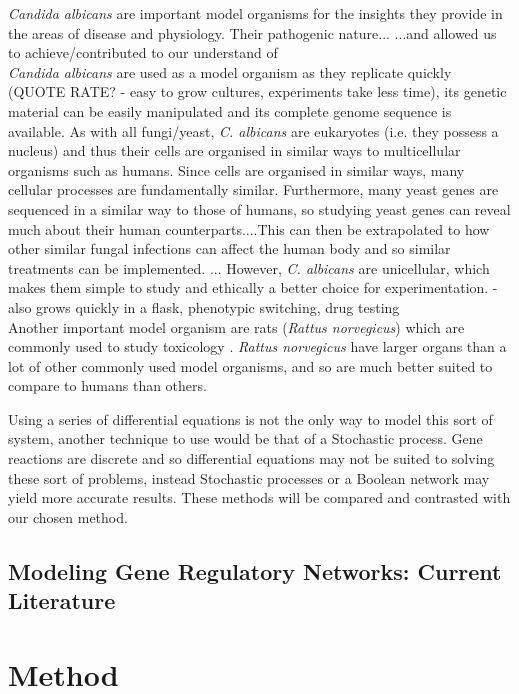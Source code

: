 \documentclass[]{article}
\begin{document}
\textit{Candida albicans} are important model organisms for the insights they provide in the areas of disease and physiology. Their pathogenic nature... %
...and allowed us to achieve/contributed to our understand of %
\\
\textit{Candida albicans} are used as a model organism as they replicate quickly (QUOTE RATE? - easy to grow cultures, experiments take less time), its genetic material can be easily manipulated and its complete genome sequence is available\cite{kabir2012candida}. As with all fungi/yeast, \textit{C. albicans} are eukaryotes (i.e. they possess a nucleus) and thus their cells are organised in similar ways to multicellular organisms such as humans. %
Since cells are organised in similar ways, many cellular processes are fundamentally similar. Furthermore, many yeast genes are sequenced in a similar way to those of humans, so studying yeast genes can reveal much about their human counterparts....This can then be extrapolated to how other similar fungal infections can affect the human body and so similar treatments can be implemented. ... However, \textit{C. albicans} are unicellular, which makes them simple to study and ethically a better choice for experimentation. 
- also grows quickly in a flask, phenotypic switching, drug testing
\\
Another important model organism are rats (\textit{Rattus norvegicus}) which are commonly used to study toxicology \cite{athanazio2008rattus}. \textit{Rattus norvegicus} have larger organs than a lot of other commonly used model organisms, and so are much better suited to compare to humans than others.

Using a series of differential equations is not the only way to model this sort of system, another technique to use would be that of a Stochastic process. Gene reactions are discrete and so differential equations may not be suited to solving these sort of problems, instead Stochastic processes or a Boolean network may yield more accurate results. These methods will be compared and contrasted with our chosen method.%

   \subsection{Modeling Gene Regulatory Networks: Current Literature}
   
\pagebreak

\section{Method}
\end{document}
